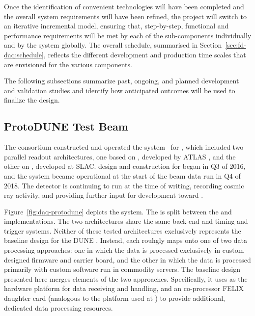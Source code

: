 Once the identification of convenient technologies will have been completed and the overall system requirements will have been refined, the project will switch to an iterative incremental model, ensuring that, step-by-step, functional and performance requirements will be met by each of the sub-components individually and by the  system globally.
The overall schedule, summarised in Section~\ref{sec:fd-daq:schedule},
reflects the different development and production time scales that are
envisioned for the various  components.


The following subsections summarize past, ongoing, and planned
development and validation studies and identify how anticipated outcomes
will be used to finalize the  design.

\subsection{ProtoDUNE Test Beam}

\label{sec:fd-daq:protodune}

The   consortium constructed and operated the  system~\cite{Sipos:2018auh} for , which included two parallel  readout architectures, one based on , developed by ATLAS \cite{atlas-felix}, and the other on , developed at SLAC.  design and construction for  began in Q3 of 2016, and the system became operational at the start of the beam data run in Q4 of 2018. The detector is continuing to run at the time of writing, recording cosmic ray activity, and providing further input for  development toward . 

Figure~\ref{fig:daq-protodune} depicts the   system. 
The  is split between the  and  implementations. The two architectures share the same back-end and timing and trigger systems. 
Neither of these tested architectures exclusively represents the baseline design for the DUNE . Instead, each rouhgly maps onto one of two data processing approaches: one in which the data is processed exclusively in custom-designed  firmware and carrier board, and the other in which the data is processed primarily with custom software run in commodity servers. The baseline design presented here merges elements of the two approaches. Specifically, it uses  as the hardware platform for data receiving and handling, and an co-processor FELIX daughter card (analogous to the  platform used at ) to provide additional, dedicated data processing resources.


